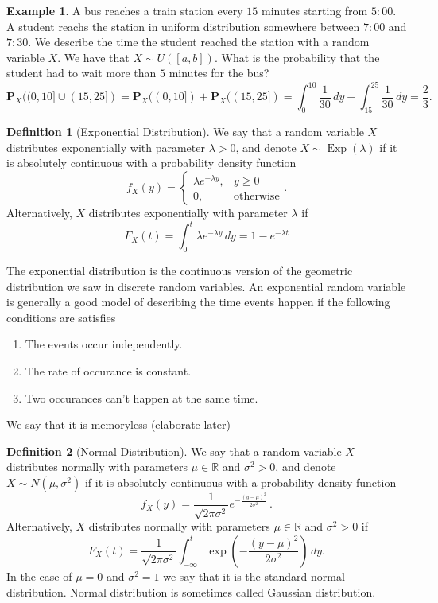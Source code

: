 \documentclass[11pt,a4paper]{article}
\theoremstyle{definition}
\newtheorem{definition}{Definition}[section]
\newtheorem{example}{Example}[section]
\theoremstyle{plain}
\DeclareMathOperator{\Exp}{Exp}
\newcommand{\R}{\mathbb{R}}
\newcommand{\Prob}{\mathbf{P}}
\begin{document}
  \begin{example}
    A bus reaches a train station every $15$ minutes starting from $5:00$.
    A student reachs the station in uniform distribution somewhere between
    $7:00$ and $7:30$. We describe the time the student reached the station
    with a random variable $X$. We have that $X \sim U([a,b])$. What
    is the probability that the student had to wait more than $5$ minutes
    for the bus?
    \[
      \Prob_X((0,10] \cup (15,25]) =
      \Prob_X((0,10]) + \Prob_X((15,25]) =
      \int_{0}^{10} \frac{1}{30}\,dy + \int_{15}^{25} \frac{1}{30}\,dy =
      \frac{2}{3}.
    \]
  \end{example}

  \begin{definition}[Exponential Distribution]
    We say that a random variable $X$ distributes exponentially with parameter
    $\lambda > 0$, and denote $X \sim \Exp(\lambda)$
    if it is absolutely continuous with a probability density function
    \[
      f_X(y) =
      \begin{cases}
        \lambda e^{-\lambda y}, &y \geq 0 \\
        0, &\text{otherwise}
      \end{cases}.
    \]
    Alternatively, $X$ distributes exponentially with parameter $\lambda$ if
    \[
      F_X(t) = \int_{0}^{t} \lambda e^{-\lambda y}\,dy = 1 - e^{-\lambda t}
    \]
  \end{definition}

  The exponential distribution is the continuous version of the geometric
  distribution we saw in discrete random variables. An exponential random
  variable is generally a good model of describing the time events happen
  if the following conditions are satisfies
  \begin{enumerate}
    \item The events occur independently.
    \item The rate of occurance is constant.
    \item Two occurances can't happen at the same time.
  \end{enumerate}
  We say that it is memoryless (elaborate later) %

  \begin{definition}[Normal Distribution]
    We say that a random variable $X$ distributes normally with parameters
    $\mu \in \R$ and $\sigma^2 > 0$, and denote $X \sim N(\mu, \sigma^2)$
    if it is absolutely continuous with a probability density function
    \[
      f_X(y) = 
      \frac {1}{\sqrt {2\pi \sigma ^{2}}}
      e^{-{\frac {(y-\mu)^{2}}{2\sigma ^{2}}}}\,.
    \]
    Alternatively, $X$ distributes normally with parameters $\mu \in \R$ and 
    $\sigma^2 > 0$ if
    \[
      F_X(t) = 
      \frac{1}{\sqrt{2\pi\sigma^{2}}}
      \int_{-\infty}^{t}
      \exp\left(-\frac{(y-\mu)^{2}}{2\sigma^{2}}\right)\,dy.
    \]
    In the case of $\mu = 0$ and $\sigma^2 = 1$ we say that it is the 
    standard normal distribution.
    Normal distribution is sometimes called Gaussian distribution.
  \end{definition}
\end{document}
